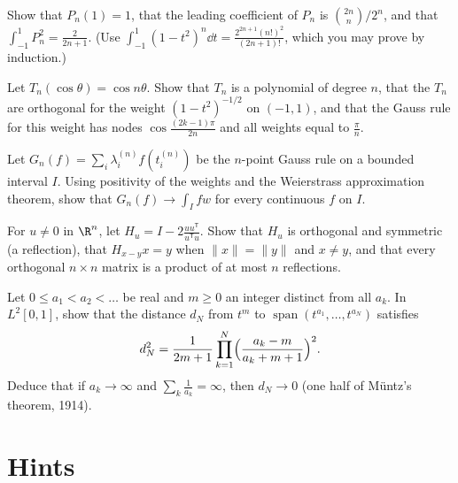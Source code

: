 \begin{exercise}[$\star\star$]\label{linear:ex:legendrenorm}
Show that $P_n(1)=1$, that the leading coefficient of $P_n$ is $\binom{2n}n/2^n$, and that $\int_{-1}^1P_n^2=\frac2{2n+1}$.
(Use $\int_{-1}^1(1-t^2)^n\dd t=\frac{2^{2n+1}(n!)^2}{(2n+1)!}$, which you may prove by induction.)
\end{exercise}

\begin{exercise}[$\star\star$]\label{linear:ex:chebyshev}
Let $T_n(\cos\theta)=\cos n\theta$. Show that $T_n$ is a polynomial of degree $n$, that the $T_n$ are orthogonal for the
weight $(1-t^2)^{-1/2}$ on $(-1,1)$, and that the Gauss rule for this weight has nodes $\cos\frac{(2k-1)\pi}{2n}$ and all
weights equal to $\frac\pi n$.
\end{exercise}

\begin{exercise}[$\star\star$]\label{linear:ex:gaussconv}
Let $G_n(f)=\sum_i\lambda_i^{(n)}f(t_i^{(n)})$ be the $n$-point Gauss rule on a bounded interval $I$. Using positivity of the
weights and the Weierstrass approximation theorem, show that $G_n(f)\to\int_Ifw$ for every continuous $f$ on $I$.
\end{exercise}

\begin{exercise}[$\star\star$]\label{linear:ex:householder}
For $u\ne0$ in $\R^n$, let $H_u=I-2\frac{uu^{\mathsf T}}{u^{\mathsf T}u}$. Show that $H_u$ is orthogonal and symmetric (a
reflection), that $H_{x-y}x=y$ when $\|x\|=\|y\|$ and $x\ne y$, and that every orthogonal $n\times n$ matrix is a product of
at most $n$ reflections.
\end{exercise}

\begin{exercise}[$\star\star\star$]\label{linear:ex:muntz}
Let $0\le a_1<a_2<\dots$ be real and $m\ge0$ an integer distinct from all $a_k$. In $L^2[0,1]$, show that the distance
$d_N$ from $t^m$ to $\operatorname{span}(t^{a_1},\dots,t^{a_N})$ satisfies
\[
d_N^2=\frac1{2m+1}\prod_{k=1}^N\Bigl(\frac{a_k-m}{a_k+m+1}\Bigr)^2.
\]
Deduce that if $a_k\to\infty$ and $\sum_k\frac1{a_k}=\infty$, then $d_N\to0$ (one half of M\"untz's theorem, 1914).
\end{exercise}

\section{Hints}

